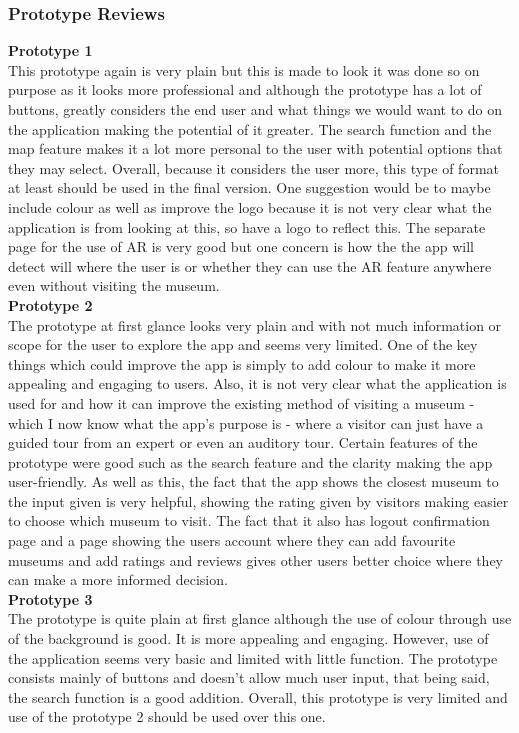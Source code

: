 \newpage
\subsubsection{Prototype Reviews}
\textbf{Prototype 1}\\
This prototype again is very plain but this is made to look it was done so on purpose as it looks more professional and although the prototype has a lot of buttons, greatly considers the end user and what things we would want to do on the application making the potential of it greater. The search function and the map feature makes it a lot more personal to the user with potential options that they may select. Overall, because it considers the user more, this type of format at least should be used in the final version. One suggestion would be to maybe include colour as well as improve the logo because it is not very clear what the application is from looking at this, so have a logo to reflect this. The separate page for the use of AR is very good but one concern is how the the app will detect will where the user is or whether they can use the AR feature anywhere even without visiting the museum.\\

\textbf{Prototype 2}\\
The prototype at first glance looks very plain and with not much information or scope for the user to explore the app and seems very limited. One of the key things which could improve the app is simply to add colour to make it more appealing and engaging to users. Also, it is not very clear what the application is used for and how it can improve the existing method of visiting a museum - which I now know what the app’s purpose is - where a visitor can just have a guided tour from an expert or even an auditory tour. Certain features of the prototype were good such as the search feature and the clarity making the app user-friendly. As well as this, the fact that the app shows the closest museum to the input given is very helpful, showing the rating given by visitors making easier to choose which museum to visit. The fact that it also has logout confirmation page and a page showing the users account where they can add favourite museums and add ratings and reviews gives other users better choice where they can make a more informed decision.\\

\textbf{Prototype 3}\\
The prototype is quite plain at first glance although the use of colour through use of the background is good. It is more appealing and engaging. However, use of the application seems very basic and limited with little function. The prototype consists mainly of buttons and doesn’t allow much user input, that being said, the search function is a good addition. Overall, this prototype is very limited and use of the prototype 2 should be used over this one.

